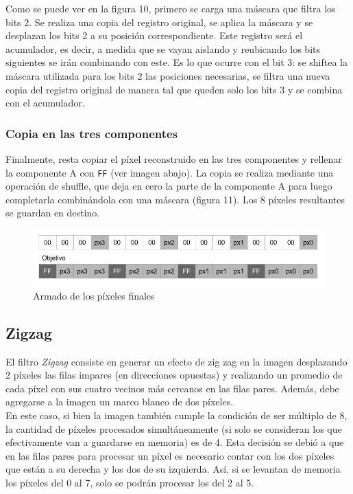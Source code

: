\documentclass[a4paper]{article}
\begin{document}
Como se puede ver en la figura 10, primero se carga una máscara que filtra los bits 2. Se realiza una copia del registro original, se aplica la máscara y se desplazan los bits 2 a su posición correspondiente. Este registro será el acumulador, es decir, a medida que se vayan aislando y reubicando los bits siguientes se irán combinando con este. Es lo que ocurre con el bit 3: se shiftea la máscara utilizada para los bits 2 las posiciones necesarias, se filtra una nueva copia del registro original de manera tal que queden solo los bits 3 y se combina con el acumulador.

\subsubsection{Copia en las tres componentes}
Finalmente, resta copiar el píxel reconstruido en las tres componentes y rellenar la componente A con {\tt FF} (ver imagen abajo). La copia se realiza mediante una operación de shuffle, que deja en cero la parte de la componente A para luego completarla combinándola con una máscara (figura 11). Los 8 píxeles resultantes se guardan en destino.

\begin{figure}[!htb]
  \begin{center}
	\includegraphics[scale=0.4]{img/descubrir/GrisesPor3.jpg}
	\caption{Armado de los píxeles finales}
  \end{center}
\end{figure}

\subsection{Zigzag}
El filtro \textit{Zigzag} consiste en generar un efecto de zig zag en la imagen desplazando 2 píxeles las filas impares (en direcciones opuestas) y realizando un promedio de cada píxel con sus cuatro vecinos más cercanos en las filas pares. Además, debe agregarse a la imagen un marco blanco de dos píxeles. \\
En este caso, si bien la imagen también cumple la condición de ser múltiplo de 8, la cantidad de píxeles procesados simultáneamente (si solo se consideran los que efectivamente van a guardarse en memoria) es de 4. Esta decisión se debió a que en las filas pares para procesar un píxel es necesario contar con los dos píxeles que están a su derecha y los dos de su izquierda. Así, si se levantan de memoria los píxeles del 0 al 7, solo se podrán procesar los del 2 al 5.
\end{document}

